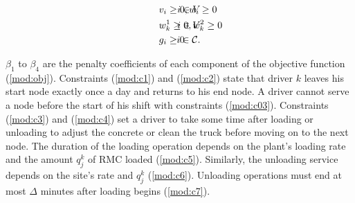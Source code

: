 \begin{alignat}{3}
    \label{mod:c37}        & v_i \geq 0,  w_i \geq 0                                                                                                                                                                                                                                                                          & \hspace{-20mm}  i \in V                                                                          \\
    \label{mod:c38}        & w^1_{k} \geq 0,  w^2_k \geq 0                                                                                                                                                                                                                                                                    & \hspace{-20mm}  i \in V                                                                          \\
    \label{mod:cend}       & g_i \geq 0                                                                                                                                                                                                                                                                                       & \hspace{-20mm}  i \in \mathcal{C}.
\end{alignat}

$\beta_1$ to $\beta_4$ are the penalty coefficients of each component of the objective function (\ref{mod:obj}). Constraints (\ref{mod:c1}) and (\ref{mod:c2}) state that driver $k$ leaves his start node exactly once a day and returns to his end node. A driver cannot serve a node before the start of his shift with constraints (\ref{mod:c03}). Constraints (\ref{mod:c3}) and (\ref{mod:c4}) set a driver to take some time after loading or unloading to adjust the concrete or clean the truck before moving on to the next node. The duration of the loading operation depends on the plant's loading rate and the amount $q^k_j$ of RMC loaded (\ref{mod:c5}). Similarly, the unloading service depends on the site's rate and $q^k_j$ (\ref{mod:c6}). Unloading operations must end at most $\Delta$ minutes after loading begins (\ref{mod:c7}).

